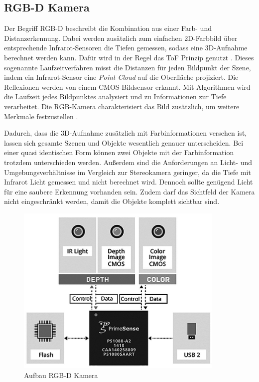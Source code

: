\subsection{RGB-D Kamera}\label{sec:RGB-D_Kamera} \ver
Der Begriff RGB-D beschreibt die Kombination aus einer Farb- und Distanzerkennung. Dabei werden zusätzlich zum einfachen 2D-Farbbild über entsprechende Infrarot-Sensoren die Tiefen gemessen, sodass eine 3D-Aufnahme berechnet werden kann. Dafür wird in der Regel das \ac{ToF} Prinzip genutzt \cite{prof_dr-ing_gunter_pomaska_tiefenkameras_2013}. Dieses sogenannte Laufzeitverfahren misst die Distanzen für jeden Bildpunkt der Szene, indem ein Infrarot-Sensor eine \textit{Point Cloud} auf die Oberfläche projiziert. Die Reflexionen werden von einem CMOS-Bildsensor erkannt. Mit Algorithmen wird die Laufzeit jedes Bildpunktes analysiert und zu Informationen zur Tiefe verarbeitet. Die RGB-Kamera charakterisiert das Bild zusätzlich, um weitere Merkmale festzustellen \cite{prof_dr-ing_gunter_pomaska_tiefenkameras_2013}.

Dadurch, dass die 3D-Aufnahme zusätzlich mit Farbinformationen versehen ist, lassen sich gesamte Szenen und Objekte wesentlich genauer unterscheiden. Bei einer quasi identischen Form können zwei Objekte mit der Farbinformation trotzdem unterschieden werden. Außerdem sind die Anforderungen an Licht- und Umgebungsverhältnisse im Vergleich zur Stereokamera geringer, da die Tiefe mit Infrarot Licht gemessen und nicht berechnet wird. Dennoch sollte genügend Licht für eine saubere Erkennung vorhanden sein. Zudem darf das Sichtfeld der Kamera nicht eingeschränkt werden, damit die Objekte komplett sichtbar sind.

\begin{figure}[ht]
    \centering
    \includegraphics[width=10cm]{Bilder/primeSensor.png}
    \caption{Aufbau RGB-D Kamera \cite{prof_dr-ing_gunter_pomaska_primesensorpng_2013}}
\end{figure}

